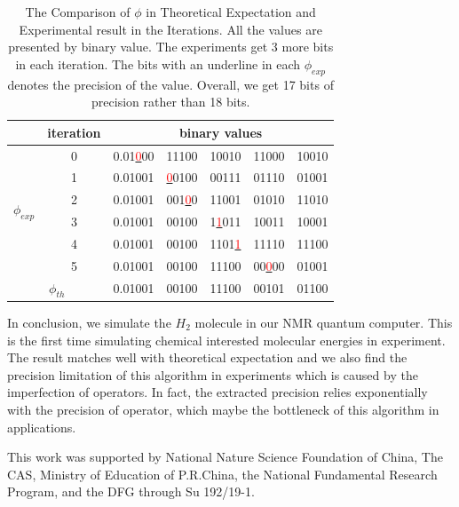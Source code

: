 \documentclass[twocolumn,showpacs,twoside,10pt,superscriptaddress,prl]{revtex4}
\begin{document}
\begin{table}[htb]
\begin{center} {\footnotesize
\begin{tabular}{|c|c|ccccc|}
\hline
 & iteration & \multicolumn{5}{c}{binary values}\\
\hline
 \multirow{6}{*}{$\phi_{exp}$}
 & 0 & 0.01\underline{\textcolor{Red}{0}}00 & 11100 & 10010 & 11000 & 10010 \\
 &  1 & 0.01001 & \underline{\textcolor{Red}{0}}0100 & 00111 & 01110 & 01001\\
 &  2 & 0.01001 & 001\underline{\textcolor{Red}{0}}0 & 11001 & 01010 & 11010\\
 &  3 & 0.01001 & 00100 & 1\underline{\textcolor{Red}{1}}011 & 10011 & 10001\\
 &  4 & 0.01001 & 00100 & 1101\underline{\textcolor{Red}{1}} & 11110 & 11100\\
 &  5 & 0.01001 & 00100 & 11100 & 00\underline{\textcolor{Red}{0}}00 & 01001\\
\hline
\multicolumn{2}{|c|}{$\phi_{th}$} & 0.01001 & 00100 & 11100 & 00101 & 01100  \\
\hline
\end{tabular} }
\end{center}
\caption{\footnotesize The Comparison of $\phi$ in Theoretical
Expectation and Experimental result in the Iterations. All the
values are presented by binary value. The experiments get 3 more
bits in each iteration. The bits with an underline in each
$\phi_{exp}$ denotes the precision of the value. Overall, we get 17
bits of precision rather than 18 bits.} \label{comparision}
\end{table}

In conclusion, we simulate the $H_2$ molecule in our NMR quantum
computer. This is the first time simulating chemical interested
molecular energies in experiment. The result matches well with
theoretical expectation and we also find the precision limitation of
this algorithm in experiments which is caused by the imperfection of
operators. In fact, the extracted precision relies exponentially
with the precision of operator, which maybe the bottleneck of this
algorithm in applications.


This work was supported by National Nature Science Foundation of
China, The CAS, Ministry of Education of P.R.China, the National
Fundamental Research Program, and the DFG through Su 192/19-1.


\end{document}
